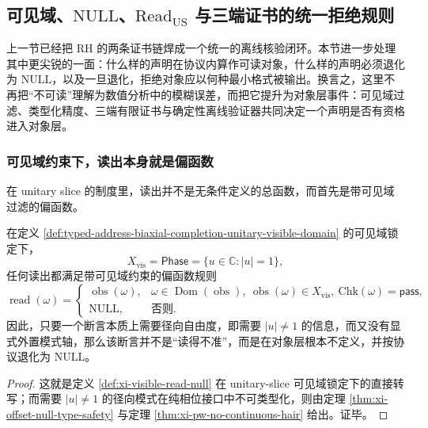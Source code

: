 \subsection{可见域、\texorpdfstring{$\mathrm{NULL}$}{NULL}、\texorpdfstring{$\mathrm{Read}_{\mathrm{US}}$}{Read\_US} 与三端证书的统一拒绝规则}\label{subsec:typed-address-biaxial-completion-visible-null-read-us-unified-rejection}
上一节已经把 RH 的两条证书链焊成一个统一的离线核验闭环。本节进一步处理其中更尖锐的一面：什么样的声明在协议内算作可读对象，什么样的声明必须退化为 \(\mathrm{NULL}\)，以及一旦退化，拒绝对象应以何种最小格式被输出。换言之，这里不再把“不可读”理解为数值分析中的模糊误差，而把它提升为对象层事件：可见域过滤、类型化精度、三端有限证书与确定性离线验证器共同决定一个声明是否有资格进入对象层。

\subsubsection{可见域约束下，读出本身就是偏函数}\label{subsubsec:typed-address-biaxial-completion-visible-read-partial}
在 unitary slice 的制度里，读出并不是无条件定义的总函数，而首先是带可见域过滤的偏函数。

\begin{proposition}[可见域约束下的偏读出]\label{prop:typed-address-biaxial-completion-visible-read-partial}
在定义 \ref{def:typed-address-biaxial-completion-unitary-visible-domain} 的可见域锁定下，
\[
X_{\mathrm{vis}}=\mathsf{Phase}=\{u\in\mathbb C:|u|=1\},
\]
任何读出都满足带可见域约束的偏函数规则
\[
\operatorname{read}(\omega)=
\begin{cases}
\operatorname{obs}(\omega),&
\omega\in\operatorname{Dom}(\operatorname{obs}),\
\operatorname{obs}(\omega)\in X_{\mathrm{vis}},\
\mathrm{Chk}(\omega)=\mathsf{pass},\\
\mathrm{NULL},&\text{否则}.
\end{cases}
\]
因此，只要一个断言本质上需要径向自由度，即需要 \(|u|\neq 1\) 的信息，而又没有显式外置模式轴，那么该断言并不是“读得不准”，而是在对象层根本不定义，并按协议退化为 \(\mathrm{NULL}\)。
\end{proposition}
\begin{proof}
这就是定义 \ref{def:xi-visible-read-null} 在 unitary-slice 可见域锁定下的直接转写；而需要 \(|u|\neq 1\) 的径向模式在纯相位接口中不可类型化，则由定理 \ref{thm:xi-offset-null-type-safety} 与定理 \ref{thm:xi-pw-no-continuous-hair} 给出。证毕。
\end{proof}

